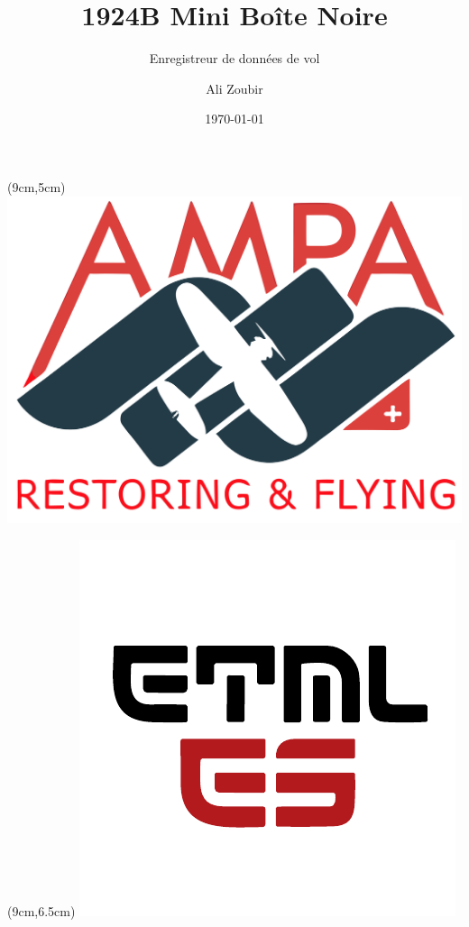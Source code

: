 \documentclass{beamer}
\title{1924B Mini Boîte Noire}
\subtitle{Enregistreur de données de vol}
\author{Ali Zoubir}
\institute{\textbf{ETML-\textcolor{red}{ES}}}
\date{\today}
\begin{document}
	
\begin{frame}[plain]
	\maketitle
	\begin{textblock*}{2cm}(9cm,5cm) %
		\includegraphics[width=1\linewidth]{../figures/AMPA}
	\end{textblock*}
	\begin{textblock*}{2cm}(9cm,6.5cm) %
		\includegraphics[width=1\linewidth]{../figures/ETML-ES}
	\end{textblock*}
\end{frame}
\end{document}
